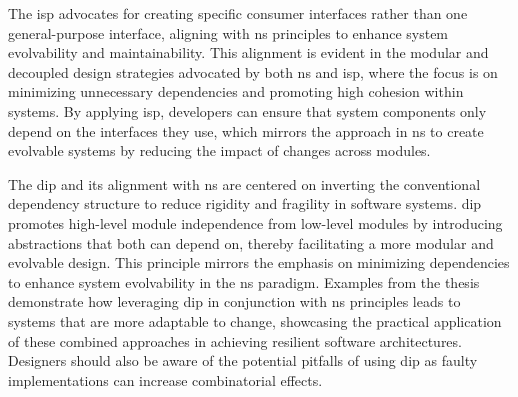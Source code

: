 The \gls{isp} advocates for creating specific consumer interfaces rather than one
general-purpose interface, aligning with \gls{ns} principles to enhance system
evolvability and maintainability. This alignment is evident in the modular and decoupled
design strategies advocated by both \gls{ns} and \gls{isp}, where the focus is on
minimizing unnecessary dependencies and promoting high cohesion within systems. By
applying \gls{isp}, developers can ensure that system components only depend on the
interfaces they use, which mirrors the approach in \gls{ns} to create evolvable systems by
reducing the impact of changes across modules.

The \gls{dip} and its alignment with \gls{ns} are centered on inverting the conventional
dependency structure to reduce rigidity and fragility in software systems. \gls{dip}
promotes high-level module independence from low-level modules by introducing abstractions
that both can depend on, thereby facilitating a more modular and evolvable design. This
principle mirrors the emphasis on minimizing dependencies to enhance system evolvability
in the \gls{ns} paradigm. Examples from the thesis demonstrate how leveraging \gls{dip} in
conjunction with \gls{ns} principles leads to systems that are more adaptable to change,
showcasing the practical application of these combined approaches in achieving resilient
software architectures. Designers should also be aware of the potential pitfalls of using
\gls{dip} as faulty implementations can increase combinatorial effects.




